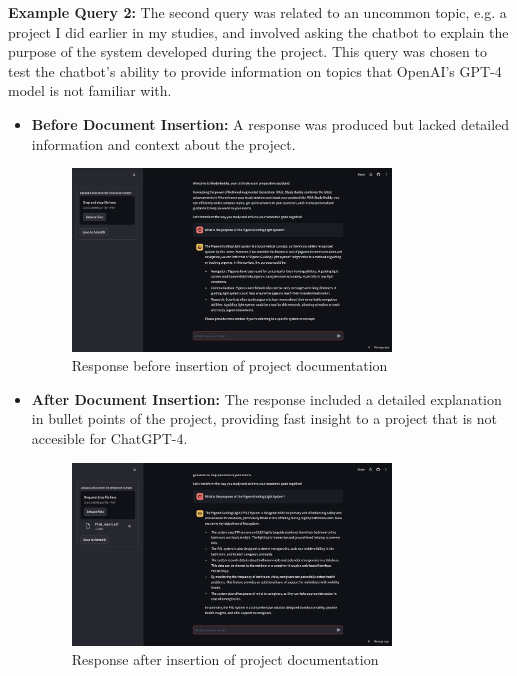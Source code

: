 \textbf{Example Query 2:}\label{uncommon_topic}
The second query was related to an uncommon topic, e.g. a project I did earlier in my studies, and involved asking the chatbot to explain the purpose of the system developed during the project. This query was chosen to test the chatbot's ability to provide information on topics that OpenAI's GPT-4 model is not familiar with.
\begin{itemize}
    \item \textbf{Before Document Insertion:} A response was produced but lacked detailed information and context about the project. 
    \begin{figure}[H]
        \centering
        \includegraphics[width=0.8\textwidth]{figs/BeforePGL.png}
        \caption{Response before insertion of project documentation}
        \label{fig:before_project}
    \end{figure}
    \item \textbf{After Document Insertion:} The response included a detailed explanation in bullet points of the project, providing fast insight to a project that is not accesible for ChatGPT-4.
    \begin{figure}[H]
        \centering
        \includegraphics[width=0.8\textwidth]{figs/AfterPGL.png}
        \caption{Response after insertion of project documentation}
        \label{fig:after_project}
    \end{figure}
\end{itemize}

